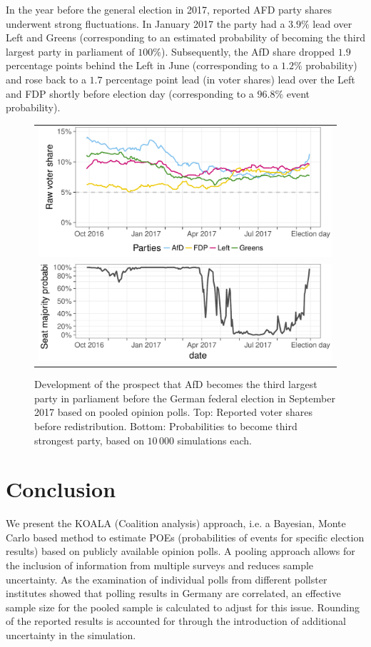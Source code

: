 \documentclass[smallcondensed]{svjour3}     %
\begin{document}
In the year before the general election in 2017, reported AFD party shares
underwent strong fluctuations. In January 2017 the party had a $3.9\%$ lead
over Left and Greens (corresponding to an estimated probability of becoming the
third largest party in parliament of $100\%$). Subsequently, the AfD share
dropped $1.9$ percentage points behind the Left in June
(corresponding to a $1.2\%$ probability)
and rose back to a $1.7$ percentage point lead (in voter shares) lead over the Left
and FDP shortly before election day (corresponding to a $96.8\%$ event probability).

\begin{figure}[H]\centering
\begin{tabular}{l}
\includegraphics[height=.2\textwidth]{figures/2017_pooled_afd_rawShares.pdf}
\\
\includegraphics[height=.15\textwidth]{figures/2017_pooled_afd_thirdPartyProb.pdf}
\end{tabular}
\caption{Development of the prospect that AfD becomes the third largest party
in parliament before the German federal election in September 2017 based on pooled
opinion polls.
Top: Reported voter shares before redistribution.
Bottom: Probabilities to become third strongest party, based on $10\,000$ simulations each.
\label{fig:2017_afd}
}
\end{figure}


\section{Conclusion} \label{sec:conclusion}
We present the KOALA (Coalition analysis) approach, i.e. a Bayesian,
Monte Carlo based method to estimate POEs (probabilities of events for
specific election results) based on publicly available opinion polls.
A pooling approach allows for the inclusion of information from multiple
surveys and reduces sample uncertainty. As the examination of individual polls
from different pollster institutes showed that polling results in Germany are correlated,
an effective sample size for the pooled sample is calculated
to adjust for this issue. Rounding of the reported results is
accounted for through the introduction of additional uncertainty in the simulation. \\
\end{document}
